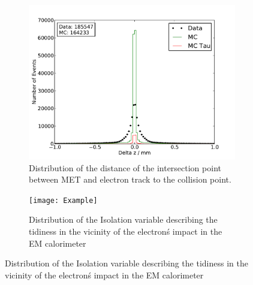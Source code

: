 \documentclass[
	paper=A4,
	parskip=full,
	chapterprefix=true,
	11pt,
	headings=normal,
	bibliography=totoc,
	listof=totoc,
	titlepage=on,
]{scrreprt}
\begin{document}
\begin{figure}%
	\centering
	\begin{subfigure}{0.45\textwidth}
		\includegraphics{nocuts/delta_z}
		\caption{Distribution of the distance of the intersection point between MET and electron track to the collision point.}
	\end{subfigure}
	\begin{subfigure}{0.45\textwidth}
		\texttt{[image: Example]}
		\caption{Distribution of the Isolation variable describing the tidiness in the vicinity of the electron\'s impact in the EM calorimeter}
	\end{subfigure}
	\label{no_cuts_dziso}
\end{figure}


\cleardoublepage


{}
\end{document}

